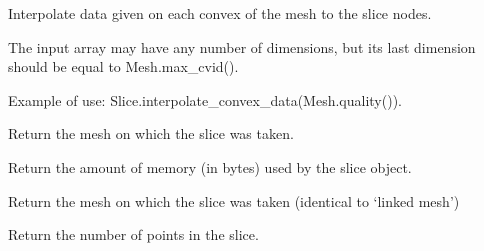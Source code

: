 \documentclass[a4paper,11pt,english]{sphinxmanual}
\begin{document}
\begin{fulllineitems}
\begin{fulllineitems}
\label{\detokenize{python/cmdref_Slice:getfem.Slice.interpolate_convex_data}}
Interpolate data given on each convex of the mesh to the slice nodes.

The input array  may have any number of dimensions, but its
last dimension should be equal to Mesh.max\_cvid().

Example of use: Slice.interpolate\_convex\_data(Mesh.quality()).

\end{fulllineitems}


\begin{fulllineitems}
\label{\detokenize{python/cmdref_Slice:getfem.Slice.linked_mesh}}
Return the mesh on which the slice was taken.

\end{fulllineitems}


\begin{fulllineitems}
\label{\detokenize{python/cmdref_Slice:getfem.Slice.memsize}}
Return the amount of memory (in bytes) used by the slice object.

\end{fulllineitems}


\begin{fulllineitems}
\label{\detokenize{python/cmdref_Slice:getfem.Slice.mesh}}
Return the mesh on which the slice was taken
(identical to ‘linked mesh’)

\end{fulllineitems}


\begin{fulllineitems}
\label{\detokenize{python/cmdref_Slice:getfem.Slice.nbpts}}
Return the number of points in the slice.


\end{fulllineitems}
\end{fulllineitems}
\end{document}
